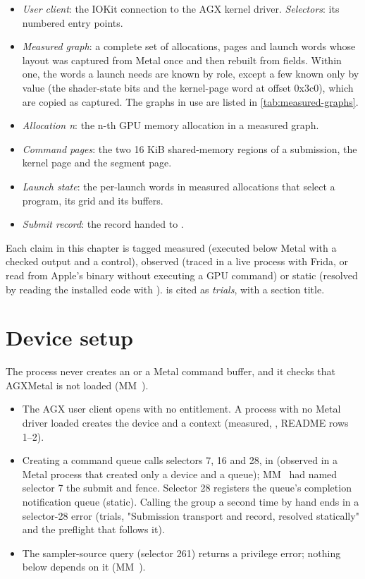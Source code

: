 \begin{itemize}
\item \emph{User client}: the IOKit connection to the AGX kernel driver. \emph{Selectors}: its numbered entry points.
\item \emph{Measured graph}: a complete set of allocations, pages and launch words whose layout was captured from Metal
  once and then rebuilt from fields. Within one, the words a launch needs are known by role, except a few known only by
  value (the shader-state bits and the kernel-page word at offset 0x3c0), which are copied as captured. The graphs in
  use are listed in \cref{tab:measured-graphs}.
\item \emph{Allocation n}: the n-th GPU memory allocation in a measured graph.
\item \emph{Command pages}: the two 16 KiB shared-memory regions of a submission, the kernel page and the segment page.
\item \emph{Launch state}: the per-launch words in measured allocations that select a program, its grid and its
  buffers.
\item \emph{Submit record}: the record handed to .
\end{itemize}

Each claim in this chapter is tagged measured (executed below Metal with a checked output and a control), observed
(traced in a live process with Frida, or read from Apple's binary without executing a GPU command) or static (resolved
by reading the installed  code with ). 
is cited as \emph{trials}, with a section title.



\section{Device setup}\label{sec:opening-device-contexts}

The process never creates an  or a Metal command buffer, and it checks that AGXMetal is not loaded
(MM~).

\begin{itemize}
\item The AGX user client opens with no entitlement. A process with no Metal driver loaded creates the device and a
  context (measured, , README rows 1–2).
\item Creating a command queue calls selectors 7, 16 and 28, in  (observed in a Metal process that
  created only a device and a queue); MM~ had named selector 7 the submit and fence. Selector 28 registers the
  queue's completion notification queue (static). Calling the group a second time by hand ends in a selector-28 error
  (trials, "Submission transport and record, resolved statically" and the preflight that follows it).
\item The sampler-source query (selector 261) returns a privilege error; nothing below depends on it (MM~).
\end{itemize}

